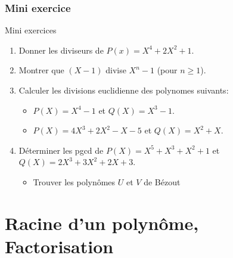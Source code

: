 \documentclass{beamer}
\begin{document}
\begin{frame}[t]
  \frametitle{Mini exercice}
 \begin{block}{Mini exercices}
   \small
   \begin{enumerate}
     \item Donner les diviseurs de $P(x) = X^4 + 2X^2 +1$.\\[4pt]
     \item Montrer que $(X-1)$ divise $X^n - 1$ (pour $n\geq 1$).\\[4pt]
     \item Calculer les divisions euclidienne des polynomes suivants: 
       \begin{itemize}
         \item $P(X)=X^4 -1$ et $Q(X) = X^3-1$.\\[4pt]
         \item $P(X)=4X^3 +2X^2-X-5$ et $Q(X)=X^2+X$.
       \end{itemize}
 \item Déterminer les pgcd de $P(X) = X^5 + X^3+X^2 + 1$ et
   $Q(X)=2X^3+3X^2+2X+3$.
   \begin{itemize}
     \item Trouver les polynômes $U$ et $V$ de Bézout
   \end{itemize}
 \end{enumerate}
 \end{block} 
\end{frame}
\section{Racine d'un polynôme, Factorisation}%
\label{sec:racine_d_un_polynôme_factorisation}
\end{document}
